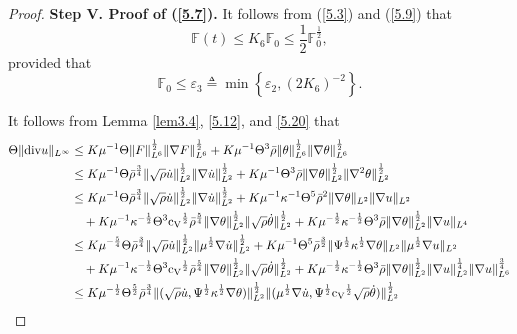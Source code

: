 \documentclass[11pt]{article}
\newcommand{\na}{\nabla}
\begin{document}
\begin{proof}
{\bf Step V. Proof of (\ref{5.7}).}
It follows from (\ref{5.3}) and (\ref{5.9}) that
$$
\mathbb{F} (t) \leq K_6 \mathbb{F}_0 \leq \frac{1}{2} \mathbb{F}_0^{\frac{1}{2}},
$$
provided that
$$
\mathbb{F}_0 \leq \varepsilon_3 \triangleq \min \left\{\varepsilon_2, (2 K_6)^{-2} \right\}.
$$

It follows from Lemma \ref{lem3.4}, \eqref{5.12}, and \eqref{5.20} that
\begin{align*}
\Theta \|{\rm div} u\|_{L^{\infty}}
& \leq K \mu^{-1} \Theta \|F\|_{L^6}^{\frac{1}{2}} \|\na F\|_{L^6}^{\frac{1}{2}} + K \mu^{-1} \Theta^3 \bar{\rho} \|\theta\|_{L^6}^{\frac{1}{2}} \|\na \theta\|_{L^6}^{\frac{1}{2}}\\
& \leq K \mu^{-1} \Theta \bar{\rho}^{\frac{3}{4}} \|\sqrt{\rho} \dot{u}\|_{L^2}^{\frac{1}{2}} \|\na \dot{u}\|_{L^2}^{\frac{1}{2}} +  K \mu^{-1} \Theta^3 \bar{\rho} \|\na \theta\|_{L^2}^{\frac{1}{2}} \|\na^2 \theta\|_{L^2}^{\frac{1}{2}}\\
& \leq K \mu^{-1} \Theta \bar{\rho}^{\frac{3}{4}} \|\sqrt{\rho} \dot{u}\|_{L^2}^{\frac{1}{2}} \|\na \dot{u}\|_{L^2}^{\frac{1}{2}} + K \mu^{-1} \kappa^{-1} \Theta^5 \bar{\rho}^2 \|\na \theta\|_{L^2} \|\na u\|_{L^2}\\
& \quad + K \mu^{-1} \kappa^{-\frac{1}{2}} \Theta^3 {\rm c_V}^{\frac{1}{2}} \bar{\rho}^{\frac{5}{4}} \|\na \theta\|_{L^2}^{\frac{1}{2}} \|\sqrt{\rho} \dot{\theta}\|_{L^2}^{\frac{1}{2}} + K \mu^{-\frac{1}{2}} \kappa^{-\frac{1}{2}} \Theta^3 \bar{\rho} \|\na \theta\|_{L^2}^{\frac{1}{2}} \|\na u\|_{L^4}\\
& \leq K \mu^{-\frac{5}{4}} \Theta \bar{\rho}^{\frac{3}{4}} \|\sqrt{\rho} \dot{u}\|_{L^2}^{\frac{1}{2}} \|\mu^{\frac{1}{2}}\na \dot{u}\|_{L^2}^{\frac{1}{2}} + K \mu^{-1} \Theta^5 \bar{\rho}^{\frac{3}{2}} \|\Psi^{\frac{1}{2}} \kappa^{\frac{1}{2}} \na \theta\|_{L^2} \|\mu^{\frac{1}{2}}\na u\|_{L^2}\\
& \quad + K \mu^{-1} \kappa^{-\frac{1}{2}} \Theta^3 {\rm c_V}^{\frac{1}{2}} \bar{\rho}^{\frac{5}{4}} \|\na \theta\|_{L^2}^{\frac{1}{2}} \|\sqrt{\rho} \dot{\theta}\|_{L^2}^{\frac{1}{2}} + K \mu^{-\frac{1}{2}} \kappa^{-\frac{1}{2}} \Theta^3 \bar{\rho} \|\na \theta\|_{L^2}^{\frac{1}{2}} \|\na u\|_{L^2}^{\frac{1}{4}} \|\na u\|_{L^6}^{\frac{3}{4}} \\
& \leq K \mu^{-\frac{1}{2}} \Theta^{\frac{5}{2}} \bar{\rho}^{\frac{3}{4}} \|(\sqrt{\rho} \dot{u}, \Psi^{\frac{1}{2}} \kappa^{\frac{1}{2}} \na \theta)\|_{L^2}^{\frac{1}{2}} \|(\mu^{\frac{1}{2}}\na \dot{u}, \Psi^{\frac{1}{2}} {\rm c_V}^{\frac{1}{2}} \sqrt{\rho} \dot{\theta})\|_{L^2}^{\frac{1}{2}}\\

\end{align*}
\end{proof}
\end{document}
